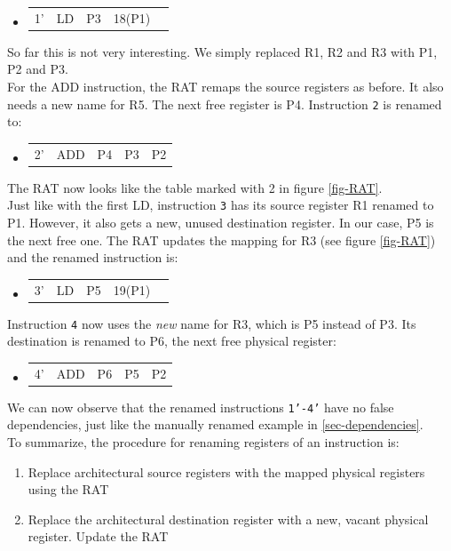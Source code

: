 \documentclass[12pt,a4paper]{article} %
\newenvironment {assembly}{\begingroup \ttfamily \color{Gray} \begin{itemize} \item[]}{\end{itemize}\endgroup}
\begin{document}
\begin{assembly}
	\begin{tabularx} {\textwidth} {n o a a X}
		1' & LD & P3 & 18(P1)		& \\
	\end{tabularx}
\end{assembly}
So far this is not very interesting. We simply replaced R1, R2 and R3 with P1, P2 and P3. \\
For the ADD instruction, the RAT remaps the source registers as before. It also needs a new name for R5. The next free register is P4. Instruction \texttt{2} is renamed to:%
\begin{assembly}
	\begin{tabularx} {\textwidth} {n o a a X}
		2' & ADD & P4 & P3		& P2\\
	\end{tabularx}
\end{assembly}
The RAT now looks like the table marked with 2 in figure \ref{fig-RAT}.\\
Just like with the first LD, instruction \texttt{3} has its source register R1 renamed to P1. However, it also gets a new, unused destination register. In our case, P5 is the next free one. The RAT updates the mapping for R3 (see figure \ref{fig-RAT}) and the renamed instruction is:
\begin{assembly}
	\begin{tabularx} {\textwidth} {n o a a X}
		3' & LD & P5 & 19(P1)		& \\
	\end{tabularx}
\end{assembly}
Instruction \texttt{4} now uses the \textit{new} name for R3, which is P5 instead of P3. Its destination is renamed to P6, the next free physical register:
\begin{assembly}
	\begin{tabularx} {\textwidth} {n o a a X}
		4' & ADD & P6 & P5		& P2\\
	\end{tabularx}
\end{assembly}
We can now observe that the renamed instructions \texttt{1'-4'} have no false dependencies, just like the manually renamed example in \ref{sec-dependencies}.\\
To summarize, the procedure for renaming registers of an instruction is:
\begin{enumerate}
	\item Replace architectural source registers with the mapped physical registers using the RAT
	\item Replace the architectural destination register with a new, vacant physical register. Update the RAT\\
\end{enumerate}
\end{document}
